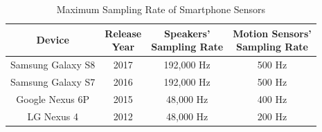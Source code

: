 \begin{table}[h]
	\caption{Maximum Sampling Rate of Smartphone Sensors}
	\label{tab:sample}
	\centering
	
	\begin{tabular}{cccc} %
		\toprule		
		Device & \makecell{Release \\Year} & \makecell{Speakers' \\ Sampling Rate} & \makecell{Motion Sensors' \\ Sampling Rate
			\footnotemark} \\
		\midrule
		Samsung Galaxy S8 & 2017 & 192,000 Hz & 500 Hz\\
		Samsung Galaxy S7 & 2016 & 192,000 Hz & 500 Hz\\		
		Google Nexus 6P & 2015 & 48,000 Hz & 400 Hz\\
		LG Nexus 4 & 2012 & 48,000 Hz& 200 Hz\\
		\bottomrule
	\end{tabular}
\end{table}




